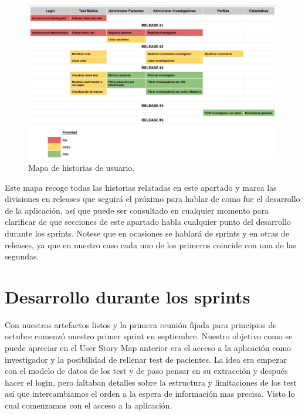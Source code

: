 \begin{figure}[h]
    \centering
     \includegraphics[width=1\textwidth]{images/userStoryMap.jpg}
    \caption{Mapa de historias de usuario.}
\end{figure}

Este mapa recoge todas las historias relatadas en este apartado y marca las divisiones en releases que seguirá el próximo para hablar de como fue el desarrollo de la aplicación, así que puede ser consultado en cualquier momento para clarificar de que secciones de este apartado habla cualquier punto del desarrollo durante los sprints. Notese que en ocasiones se hablará de sprints y en otras de releases, ya que en nuestro caso cada uno de los primeros coincide con una de las segundas.

\newpage

\section{Desarrollo durante los sprints}

Con nuestros artefactos listos y la primera reunión fijada para principios de octubre comenzó nuestro primer sprint en septiembre. Nuestro objetivo como se puede apreciar en el User Story Map anterior era el acceso a la aplicación como investigador y la posibilidad de rellenar test de pacientes. La idea era empezar con el modelo de datos de los test y de paso pensar en su extracción y después hacer el login, pero faltaban detalles sobre la estructura y limitaciones de los test así que intercambiamos el orden a la espera de información mas precisa. Visto lo cual comenzamos con el acceso a la aplicación.
\newline

